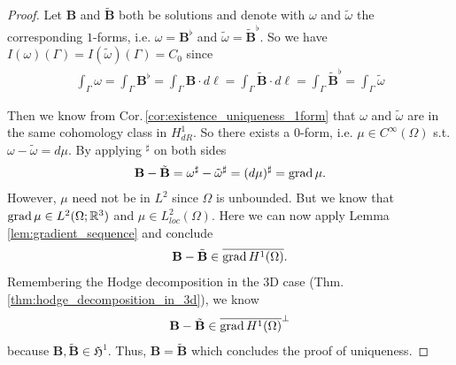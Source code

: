 \documentclass[../master_thesis.tex]{subfiles}
\begin{document}
\begin{proof}
    Let $\mathbf{B}$ and $\tilde{\mathbf{B}}$ both be solutions and denote with $\omega$ 
    and $\tilde{\omega}$ the corresponding $1$-forms, i.e. $\omega =
    \mathbf{B}^\flat$ and $\tilde{\omega} = \tilde{\mathbf{B}}^\flat$. 
    So we have $I(\omega)(\Gamma) = I(\tilde{\omega})(\Gamma) = C_0$
    since 
    \begin{align*}
        \int_\Gamma \omega = \int_\Gamma \mathbf{B}^\flat = 
        \int_\Gamma \mathbf{B} \cdot d\ell = \int_\Gamma \tilde{\mathbf{B}}\cdot d\ell 
        = \int_\Gamma \tilde{\mathbf{B}}^\flat = \int_\Gamma \tilde{\omega}
    \end{align*}

    Then we know from Cor.\,\ref{cor:existence_uniqueness_1form} 
    that $\omega$ and $\tilde{\omega}$ are in the 
    same cohomology class in $H^1_{dR}$. So there exists a $0$-form, i.e. 
    $\mu \in C^\infty(\Omega)$ s.t. $\omega - \tilde{\omega} = d\mu$.
    By applying $^\sharp$ on both sides
    \begin{align*}
        \mathbf{B} - \tilde{\mathbf{B}} 
        = \omega^\sharp - \tilde{\omega}^\sharp
        = (d\mu)^\sharp = \operatorname{grad} \mu.
    \end{align*}
    However, $\mu$ need not be in $L^2$ since $\Omega$ is unbounded.
    But we know that $\operatorname{grad} \mu \in L^2(\Omega;\mathbb{R}^3)$ and 
    $\mu \in L^2_{loc}(\Omega)$. 
    Here we can now apply Lemma \ref{lem:gradient_sequence} and conclude
    \begin{align*}
        \mathbf{B} - \tilde{\mathbf{B}} \in \overline{\operatorname{grad} H^1(\Omega)}.
    \end{align*}
    Remembering the Hodge decomposition in the 3D case (Thm.\,\ref{thm:hodge_decomposition_in_3d}), we know 
    \begin{align*}
        \mathbf{B} - \tilde{\mathbf{B}} \in \overline{\operatorname{grad} H^1(\Omega)}^\perp
    \end{align*}
    because $\mathbf{B}, \tilde{\mathbf{B}} \in \mathfrak{H}^1$.
    Thus, $\mathbf{B} = \tilde{\mathbf{B}}$ which concludes the proof of uniqueness.
\end{proof}
\end{document}
